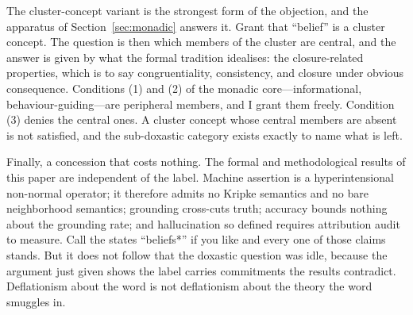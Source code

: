 The cluster-concept variant is the strongest form of the objection, and the
apparatus of Section~\ref{sec:monadic} answers it. Grant that ``belief'' is a
cluster concept. The question is then which members of the cluster are central,
and the answer is given by what the formal tradition idealises: the
closure-related properties, which is to say congruentiality, consistency, and
closure under obvious consequence. Conditions (1) and (2) of the monadic
core---informational, behaviour-guiding---are peripheral members, and I grant them
freely. Condition (3) denies the central ones. A cluster concept whose central
members are absent is not satisfied, and the sub-doxastic category exists exactly
to name what is left.

Finally, a concession that costs nothing. The formal and methodological results of
this paper are independent of the label. Machine assertion is a hyperintensional
non-normal operator; it therefore admits no Kripke semantics and no bare
neighborhood semantics; grounding cross-cuts truth; accuracy bounds nothing about
the grounding rate; and hallucination so defined requires attribution audit to
measure. Call the states ``beliefs*'' if you like and every one of those claims
stands. But it does not follow that the doxastic question was idle, because the
argument just given shows the label carries commitments the results contradict.
Deflationism about the word is not deflationism about the theory the word smuggles
in.
